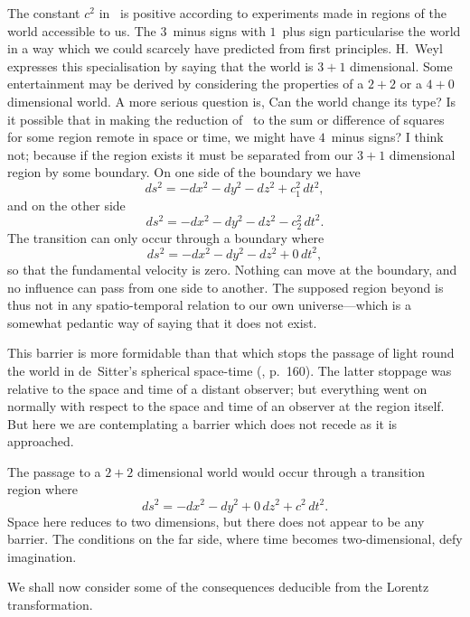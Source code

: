 \documentclass[12pt]{book}
\begin{document}

The constant $c^{2}$ in~ is positive according to experiments made in
regions of the world accessible to us. The $3$~minus signs with $1$~plus sign
particularise the world in a way which we could scarcely have predicted from
first principles. H.~Weyl expresses this specialisation by saying that the world
is $3 + 1$ dimensional. Some entertainment may be derived by considering the
properties of a $2 + 2$ or a $4 + 0$ dimensional world. A more serious question
is, Can the world change its type? Is it possible that in making the reduction
of~ to the sum or difference of squares for some region remote in space or
time, we might have $4$~minus signs? I think not; because if the region exists
it must be separated from our $3 + 1$ dimensional region by some boundary.
On one side of the boundary we have
\[
ds^{2} = -dx^{2} - dy^{2} - dz^{2} + c_{1}^{2}\, dt^{2},
\]
and on the other side
\[
ds^{2} = -dx^{2} - dy^{2} - dz^{2} - c_{2}^{2}\, dt^{2}.
\]
The transition can only occur through a boundary where
\[
ds^{2} = -dx^{2} - dy^{2} - dz^{2} + 0\, dt^{2},
\]
so that the fundamental velocity is zero. Nothing can move at the boundary,
and no influence can pass from one side to another. The supposed region
beyond is thus not in any spatio-temporal relation to our own universe---which
is a somewhat pedantic way of saying that it does not exist.

This barrier is more formidable than that which stops the passage of light
round the world in de~Sitter's spherical space-time (,
p.~160). The latter stoppage was relative to the space and time of a
distant observer; but everything went on normally with respect to the space
and time of an observer at the region itself. But here we are contemplating
a barrier which does not recede as it is approached.

The passage to a $2 + 2$ dimensional world would occur through a transition
region where
\[
ds^{2} = -dx^{2} - dy^{2} + 0\, dz^{2} + c^{2}\, dt^{2}.
\]
Space here reduces to two dimensions, but there does not appear to be any
%
barrier. The conditions on the far side, where time becomes two-dimensional,
defy imagination.

%
%

We shall now consider some of the consequences deducible from the
Lorentz transformation.
%
\end{document}
